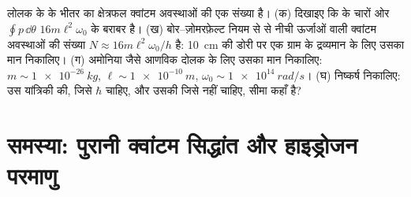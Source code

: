 \begin{exercise}[$\star\star\star$]\label{exo:b3:hamiltonian-mechanics:12}
लोलक के  के भीतर का क्षेत्रफल क्वांटम अवस्थाओं की एक
संख्या है। (क) दिखाइए कि  के चारों ओर $\oint p\,\dd\theta$
$16m\ell^2\omega_0$ के बराबर है। (ख) बोर--ज़ोमरफ़ेल्ट नियम से
 से नीची ऊर्जाओं वाली क्वांटम अवस्थाओं की संख्या $N \approx
16m\ell^2\omega_0/h$ है: \qty{10}{cm} की डोरी पर एक ग्राम के द्रव्यमान
के लिए उसका मान निकालिए। (ग) अमोनिया जैसे आणविक दोलक के लिए उसका मान
निकालिए: $m \sim \qty{1e-26}{kg}$, $\ell \sim \qty{1e-10}{m}$,
$\omega_0 \sim \qty{1e14}{rad/s}$। (घ) निष्कर्ष निकालिए: उस यांत्रिकी
की, जिसे $\hbar$ चाहिए, और उसकी जिसे नहीं चाहिए, सीमा कहाँ है?
\end{exercise}

\section{समस्या: पुरानी क्वांटम सिद्धांत और हाइड्रोजन परमाणु}

